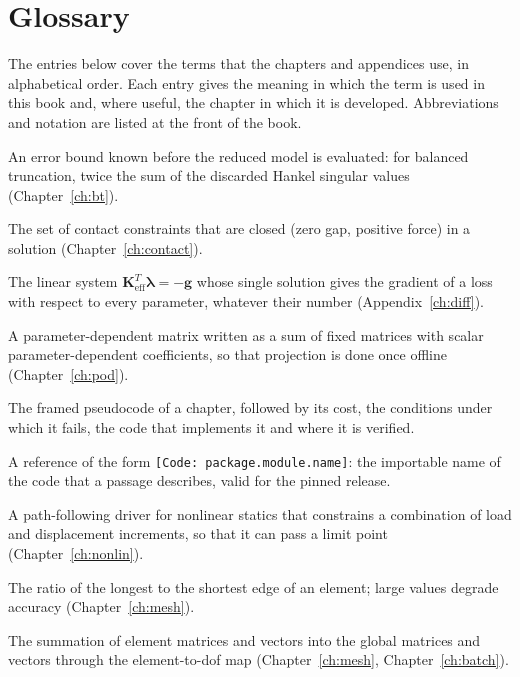 \chapter{Glossary}\label{ch:gloss}

\label{sec:gloss}

The entries below cover the terms that the chapters and appendices use, in alphabetical order. Each entry gives the meaning in which the term is used in this book and, where useful, the chapter in which it is developed. Abbreviations and notation are listed at the front of the book.

\begin{description}\small
\item[A priori bound] An error bound known before the reduced model is evaluated: for balanced truncation, twice the sum of the discarded Hankel singular values (Chapter~\ref{ch:bt}).
\item[Active set] The set of contact constraints that are closed (zero gap, positive force) in a solution (Chapter~\ref{ch:contact}).
\item[Adjoint system] The linear system $\bm K_{\mathrm{eff}}^T\bm\lambda=-\bm g$ whose single solution gives the gradient of a loss with respect to every parameter, whatever their number (Appendix~\ref{ch:diff}).
\item[Affine decomposition] A parameter-dependent matrix written as a sum of fixed matrices with scalar parameter-dependent coefficients, so that projection is done once offline (Chapter~\ref{ch:pod}).
\item[Algorithm box] The framed pseudocode of a chapter, followed by its cost, the conditions under which it fails, the code that implements it and where it is verified.
\item[Anchor, code anchor] A reference of the form \texttt{[Code: package.module.name]}: the importable name of the code that a passage describes, valid for the pinned release.
\item[Arc-length method] A path-following driver for nonlinear statics that constrains a combination of load and displacement increments, so that it can pass a limit point (Chapter~\ref{ch:nonlin}).
\item[Aspect ratio] The ratio of the longest to the shortest edge of an element; large values degrade accuracy (Chapter~\ref{ch:mesh}).
\item[Assembly] The summation of element matrices and vectors into the global matrices and vectors through the element-to-dof map (Chapter~\ref{ch:mesh}, Chapter~\ref{ch:batch}).

\end{description}
